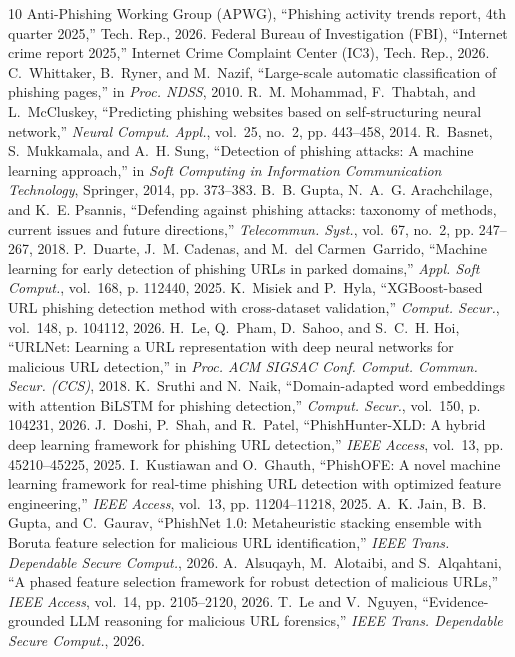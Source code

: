 \documentclass[journal]{IEEEtran}
\begin{document}

\begin{thebibliography}{10}
Anti-Phishing Working Group (APWG), ``Phishing activity trends report, 4th quarter 2025,'' Tech. Rep., 2026.
Federal Bureau of Investigation (FBI), ``Internet crime report 2025,'' Internet Crime Complaint Center (IC3), Tech. Rep., 2026.
C.~Whittaker, B.~Ryner, and M.~Nazif, ``Large-scale automatic classification of phishing pages,'' in \emph{Proc. NDSS}, 2010.
R.~M. Mohammad, F.~Thabtah, and L.~McCluskey, ``Predicting phishing websites based on self-structuring neural network,'' \emph{Neural Comput. Appl.}, vol.~25, no.~2, pp. 443--458, 2014.
R.~Basnet, S.~Mukkamala, and A.~H. Sung, ``Detection of phishing attacks: A machine learning approach,'' in \emph{Soft Computing in Information Communication Technology}, Springer, 2014, pp. 373--383.
B.~B. Gupta, N.~A.~G. Arachchilage, and K.~E. Psannis, ``Defending against phishing attacks: taxonomy of methods, current issues and future directions,'' \emph{Telecommun. Syst.}, vol.~67, no.~2, pp. 247--267, 2018.
P.~Duarte, J.~M. Cadenas, and M.~del Carmen~Garrido, ``Machine learning for early detection of phishing URLs in parked domains,'' \emph{Appl. Soft Comput.}, vol.~168, p. 112440, 2025.
K.~Misiek and P.~Hyla, ``XGBoost-based URL phishing detection method with cross-dataset validation,'' \emph{Comput. Secur.}, vol.~148, p. 104112, 2026.
H.~Le, Q.~Pham, D.~Sahoo, and S.~C.~H. Hoi, ``URLNet: Learning a URL representation with deep neural networks for malicious URL detection,'' in \emph{Proc. ACM SIGSAC Conf. Comput. Commun. Secur. (CCS)}, 2018.
K.~Sruthi and N.~Naik, ``Domain-adapted word embeddings with attention BiLSTM for phishing detection,'' \emph{Comput. Secur.}, vol.~150, p. 104231, 2026.
J.~Doshi, P.~Shah, and R.~Patel, ``PhishHunter-XLD: A hybrid deep learning framework for phishing URL detection,'' \emph{IEEE Access}, vol.~13, pp. 45210--45225, 2025.
I.~Kustiawan and O.~Ghauth, ``PhishOFE: A novel machine learning framework for real-time phishing URL detection with optimized feature engineering,'' \emph{IEEE Access}, vol.~13, pp. 11204--11218, 2025.
A.~K. Jain, B.~B. Gupta, and C.~Gaurav, ``PhishNet 1.0: Metaheuristic stacking ensemble with Boruta feature selection for malicious URL identification,'' \emph{IEEE Trans. Dependable Secure Comput.}, 2026.
A.~Alsuqayh, M.~Alotaibi, and S.~Alqahtani, ``A phased feature selection framework for robust detection of malicious URLs,'' \emph{IEEE Access}, vol.~14, pp. 2105--2120, 2026.
T.~Le and V.~Nguyen, ``Evidence-grounded LLM reasoning for malicious URL forensics,'' \emph{IEEE Trans. Dependable Secure Comput.}, 2026.
\end{thebibliography}
\end{document}
